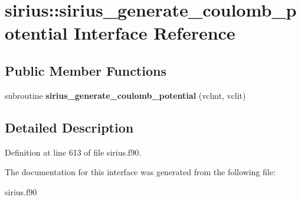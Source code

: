 \hypertarget{interfacesirius_1_1sirius__generate__coulomb__potential}{}\section{sirius\+:\+:sirius\+\_\+generate\+\_\+coulomb\+\_\+potential Interface Reference}
\label{interfacesirius_1_1sirius__generate__coulomb__potential}
\subsection*{Public Member Functions}
\begin{DoxyCompactItemize}
\item 
\hypertarget{interfacesirius_1_1sirius__generate__coulomb__potential_a7e89adb872542aa6f967f621cf073be8}{}subroutine {\bfseries sirius\+\_\+generate\+\_\+coulomb\+\_\+potential} (vclmt, vclit)\label{interfacesirius_1_1sirius__generate__coulomb__potential_a7e89adb872542aa6f967f621cf073be8}

\end{DoxyCompactItemize}


\subsection{Detailed Description}


Definition at line 613 of file sirius.\+f90.



The documentation for this interface was generated from the following file\+:\begin{DoxyCompactItemize}
\item 
sirius.\+f90\end{DoxyCompactItemize}
